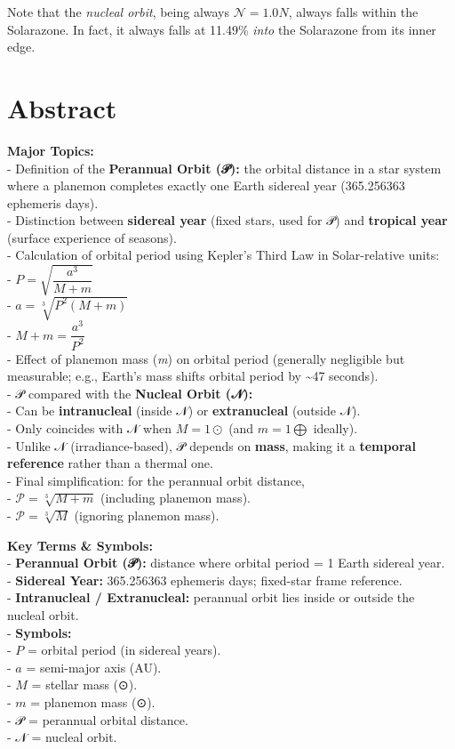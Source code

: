 \documentclass[
  letterpaper,
]{book}
\begin{document}
Note that the \emph{nucleal orbit}, being always \(\mathcal{N} = 1.0N\),
always falls within the Solarazone. In fact, it always falls at 11.49\%
\emph{into} the Solarazone from its inner edge.

\section{Abstract}\label{abstract-10}

\textbf{Major Topics:}\\
- Definition of the \textbf{Perannual Orbit (𝒫):} the orbital distance
in a star system where a planemon completes exactly one Earth sidereal
year (365.256363 ephemeris days).\\
- Distinction between \textbf{sidereal year} (fixed stars, used for 𝒫)
and \textbf{tropical year} (surface experience of seasons).\\
- Calculation of orbital period using Kepler's Third Law in
Solar-relative units:\\
- \(P = \sqrt{\dfrac{a^3}{M+m}}\)\\
- \(a = \sqrt[3]{P^2 (M+m)}\)\\
- \(M+m = \dfrac{a^3}{P^2}\)\\
- Effect of planemon mass (\emph{m}) on orbital period (generally
negligible but measurable; e.g., Earth's mass shifts orbital period by
\textasciitilde47 seconds).\\
- 𝒫 compared with the \textbf{Nucleal Orbit (𝒩):}\\
- Can be \textbf{intranucleal} (inside 𝒩) or \textbf{extranucleal}
(outside 𝒩).\\
- Only coincides with 𝒩 when \(M = 1⊙\) (and \(m = 1⨁\) ideally).\\
- Unlike 𝒩 (irradiance-based), 𝒫 depends on \textbf{mass}, making it a
\textbf{temporal reference} rather than a thermal one.\\
- Final simplification: for the perannual orbit distance,\\
- \(\mathcal{P} = \sqrt[3]{M+m}\) (including planemon mass).\\
- \(\mathcal{P} = \sqrt[3]{M}\) (ignoring planemon mass).

\textbf{Key Terms \& Symbols:}\\
- \textbf{Perannual Orbit (𝒫):} distance where orbital period = 1 Earth
sidereal year.\\
- \textbf{Sidereal Year:} 365.256363 ephemeris days; fixed-star frame
reference.\\
- \textbf{Intranucleal / Extranucleal:} perannual orbit lies inside or
outside the nucleal orbit.\\
- \textbf{Symbols:}\\
- \(P\) = orbital period (in sidereal years).\\
- \(a\) = semi-major axis (AU).\\
- \(M\) = stellar mass (⊙).\\
- \(m\) = planemon mass (⊙).\\
- 𝒫 = perannual orbital distance.\\
- 𝒩 = nucleal orbit.
\end{document}

